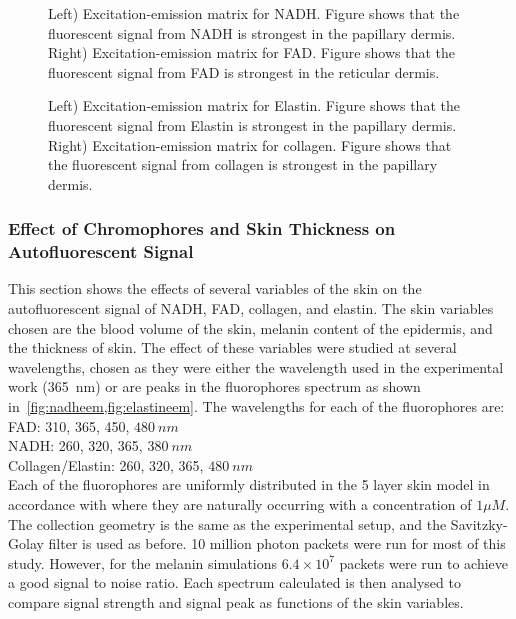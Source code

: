 \begin{figure}[!htbp]
    \centering
    \caption{Left) Excitation-emission matrix for NADH. Figure shows that the fluorescent signal from NADH is strongest in the papillary dermis.
    Right) Excitation-emission matrix for FAD. Figure shows that the fluorescent signal from FAD is strongest in the reticular dermis.}%
    \label{fig:nadheem}%
\end{figure}

\begin{figure}[!htbp]
    \centering
    \caption{Left) Excitation-emission matrix for Elastin. Figure shows that the fluorescent signal from Elastin is strongest in the papillary dermis.
    Right) Excitation-emission matrix for collagen. Figure shows that the fluorescent signal from collagen is strongest in the papillary dermis.}%
    \label{fig:elastineem}%
\end{figure}


\FloatBarrier
\subsubsection*{Effect of Chromophores and Skin Thickness on Autofluorescent Signal}

This section shows the effects of several variables of the skin on the autofluorescent signal of NADH, FAD, collagen, and elastin.
The skin variables chosen are the blood volume of the skin, melanin content of the epidermis, and the thickness of skin.
The effect of these variables were studied at several wavelengths, chosen as they were either the wavelength used in the experimental work (365~nm) or are peaks in the fluorophores spectrum as shown in~\cref{fig:nadheem,fig:elastineem}. 
The wavelengths for each of the fluorophores are:\\

\noindent FAD: 310, 365, 450, $480~nm$\\
NADH: 260, 320, 365, $380~nm$\\
Collagen/Elastin: 260, 320, 365, $480~nm$\\

Each of the fluorophores are uniformly distributed in the 5 layer skin model in accordance with where they are naturally occurring with a concentration of $1\mu M$.
The collection geometry is the same as the experimental setup, and the Savitzky-Golay filter is used as before.
10 million photon packets were run for most of this study.
However, for the melanin simulations $6.4\times10^7$ packets were run to achieve a good signal to noise ratio.
Each spectrum calculated is then analysed to compare signal strength and signal peak as functions of the skin variables.

